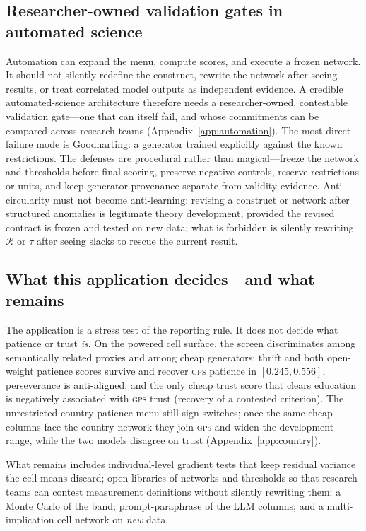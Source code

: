 \documentclass[10pt,letterpaper]{article}
\newcommand{\GPS}{\textsc{gps}}
\newcommand{\Rset}{\mathcal{R}}
\begin{document}
\subsection{Researcher-owned validation gates in automated science}
Automation can expand the menu, compute scores, and execute a frozen network.
It should not silently redefine the construct, rewrite the network after seeing results, or treat correlated model outputs as independent evidence.
A credible automated-science architecture therefore needs a researcher-owned, contestable validation gate---one that can itself fail, and whose commitments can be compared across research teams (Appendix~\ref{app:automation}).
The most direct failure mode is Goodharting: a generator trained explicitly against the known restrictions.
The defenses are procedural rather than magical---freeze the network and thresholds before final scoring, preserve negative controls, reserve restrictions or units, and keep generator provenance separate from validity evidence.
Anti-circularity must not become anti-learning: revising a construct or network after structured anomalies is legitimate theory development, provided the revised contract is frozen and tested on new data; what is forbidden is silently rewriting $\Rset$ or $\tau$ after seeing slacks to rescue the current result.

\subsection{What this application decides---and what remains}
\label{sec:agenda}
The application is a stress test of the reporting rule.
It does not decide what patience or trust \emph{is}.
On the powered cell surface, the screen discriminates among semantically related proxies and among cheap generators: thrift and both open-weight patience scores survive and recover \GPS{} patience in $[0.245,0.556]$, perseverance is anti-aligned, and the only cheap trust score that clears education is negatively associated with \GPS{} trust (recovery of a contested criterion).
The unrestricted country patience menu still sign-switches; once the same cheap columns face the country network they join \GPS{} and widen the development range, while the two models disagree on trust (Appendix~\ref{app:country}).

What remains includes individual-level gradient tests that keep residual variance the cell means discard; open libraries of networks and thresholds so that research teams can contest measurement definitions without silently rewriting them; a Monte Carlo of the band; prompt-paraphrase of the LLM columns; and a multi-implication cell network on \emph{new} data.
\end{document}
